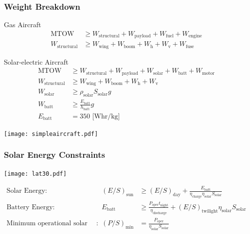 \documentclass{beamer}
\begin{document}
\begin{frame}
    \frametitle{Weight Breakdown}

    \pause
    Gas Aircraft
    \begin{align*}
        \text{MTOW} &\geq W_{\text{structural}}  + W_{\text{payload}} + W_{\text{fuel}} + W_{\text{engine}} \\
        W_{\text{structural}} &\geq W_{\text{wing}} + W_{\text{boom}} + W_{\text{h}}+ W_{\text{v}} + W_{\text{fuse}}
    \end{align*}

    \pause
    Solar-electric Aircraft
    \begin{align*}
        \text{MTOW} &\geq W_{\text{structural}} + W_{\text{payload}} + W_{\text{solar}} + W_{\text{batt}} + W_{\text{motor}} \\
        W_{\text{structural}} &\geq W_{\text{wing}} + W_{\text{boom}} + W_{\text{h}}+ W_{\text{v}} \\
        W_{\text{solar}} &\geq \rho_{\text{solar}} S_{\text{solar}} g \\
        W_{\text{batt}} &\geq \frac{E_{\text{batt}}}{h_{\text{batt}}} g \\
        E_{\text{batt}} &= 350 \text{ [Whr/kg]}
    \end{align*}

\end{frame}

\begin{frame}

    \begin{center}
    \texttt{[image: simpleaircraft.pdf]}
    \end{center}

\end{frame}

\begin{frame}
    \frametitle{Solar Energy Constraints}

    \begin{center}
    \texttt{[image: lat30.pdf]}
    \end{center}
    
    \pause
    \scriptsize
    \[ \begin{array}{rrl}
        \text{Solar Energy} : & (E/S)_{\text{sun}}  &\geq (E/S)_{\text{day}} + \frac{E_{\text{batt}}}{\eta_{\text{charge}}\eta_{\text{solar}} S_{\text{solar}}} \\
        \text{Battery Energy} : &E_{\text{batt}} &\geq \frac{P_{\text{oper}}t_{\text{night}}}{\eta_{\text{discharge}}} + (E/S)_{\text{twilight}} \eta_{\text{solar}} S_{\text{solar}} \\
        \text{Minimum operational solar power} : & (P/S)_{\text{min}} &= \frac{P_{\text{oper}}}{\eta_{\text{solar}} S_{\text{solar}}} 
    \end{array} \]

\end{frame}
\end{document}
